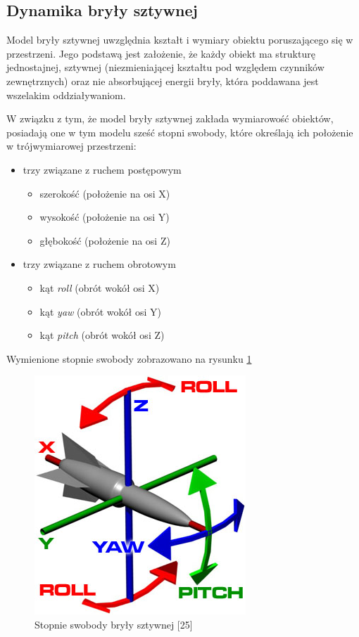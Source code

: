 \subsection{Dynamika bryły sztywnej}
\par{
Model bryły sztywnej uwzględnia kształt i wymiary obiektu poruszającego się w przestrzeni. Jego podstawą jest założenie, że każdy obiekt ma strukturę jednostajnej, sztywnej (niezmieniającej kształtu pod względem czynników zewnętrznych) oraz nie absorbującej energii bryły, która poddawana jest wszelakim oddziaływaniom.
}
\par{
W związku z tym, że model bryły sztywnej zakłada wymiarowość obiektów, posiadają one w tym modelu sześć stopni swobody, które określają ich położenie w trójwymiarowej przestrzeni:
\begin{itemize}
\item trzy związane z ruchem postępowym
\renewcommand{\labelitemi}{$\bullet$}
	\begin{itemize}
	\item szerokość (położenie na osi X)
	\item wysokość (położenie na osi Y)
	\item głębokość (położenie na osi Z)
	\end{itemize}
\item trzy związane z ruchem obrotowym
	\begin{itemize}
	\item kąt \textit{roll} (obrót wokół osi X)
	\item kąt \textit{yaw} (obrót wokół osi Y)
	\item kąt \textit{pitch} (obrót wokół osi Z)
	\end{itemize}
\end{itemize}
Wymienione stopnie swobody zobrazowano na rysunku \ref{ryp}
\begin{figure}[htb]
    \begin{center}
	\includegraphics[]{img/xyz_ryp.jpg}
	\caption{Stopnie swobody bryły sztywnej [25]}
	\label{ryp}
    \end{center}
\end{figure}
}
